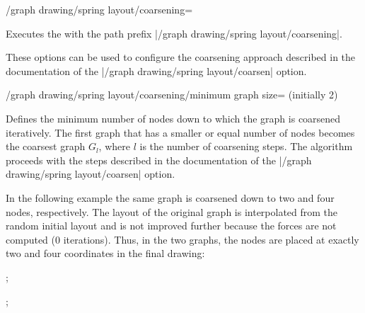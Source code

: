 \begin{key}{/graph drawing/spring layout/coarsening=}

  Executes the  with the path prefix 
  |/graph drawing/spring layout/coarsening|.

  These options can be used to configure the coarsening approach
  described in the documentation of the 
  |/graph drawing/spring layout/coarsen| option.
\end{key}

\begin{key}{/graph drawing/spring layout/coarsening/minimum graph
  size= (initially 2)}

  Defines the minimum number of nodes down to which the graph is 
  coarsened iteratively. The first graph that has a smaller or equal 
  number of nodes becomes the coarsest graph $G_l$, where $l$ is the 
  number of coarsening steps. The algorithm proceeds with the steps 
  described in the documentation of the 
  |/graph drawing/spring layout/coarsen| option.

  In the following example the same graph is coarsened down to two
  and four nodes, respectively. The layout of the original graph is 
  interpolated from the random initial layout and is not improved
  further because the forces are not computed (0 iterations). Thus, 
  in the two graphs, the nodes are placed at exactly two and four
  coordinates in the final drawing:
  \begin{codeexample}[width=5.5cm]
\tikz {};

\tikz {};
  \end{codeexample}
\end{key}

